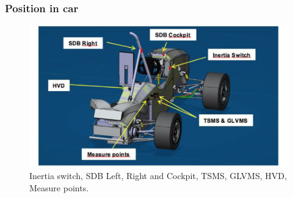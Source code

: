 \subsubsection{Position in car}

\begin{figure}[H]
	\includegraphics[width=\textwidth]{./img/SDC-positionInCar.png}
	\caption{Inertia switch, SDB Left, Right and Cockpit, TSMS, GLVMS, HVD, Measure points.}
	\label{fig:SDC-positionInCar}
\end{figure}

